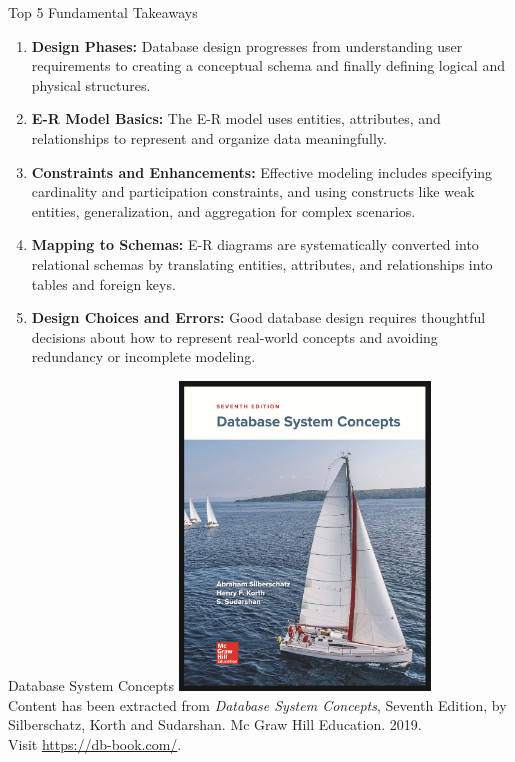 \documentclass{beamer}
\begin{document}
\begin{frame}{Top 5 Fundamental Takeaways}
    \small
    \begin{enumerate} \pause
        \item[5] \textbf{Design Phases:} Database design progresses from understanding user requirements to creating a conceptual schema and finally defining logical and physical structures. \pause

        \item[4] \textbf{E-R Model Basics:} The E-R model uses entities, attributes, and relationships to represent and organize data meaningfully. \pause

        \item[3] \textbf{Constraints and Enhancements:} Effective modeling includes specifying cardinality and participation constraints, and using constructs like weak entities, generalization, and aggregation for complex scenarios. \pause

        \item[2] \textbf{Mapping to Schemas:} E-R diagrams are systematically converted into relational schemas by translating entities, attributes, and relationships into tables and foreign keys. \pause

        \item[1] \textbf{Design Choices and Errors:} Good database design requires thoughtful decisions about how to represent real-world concepts and avoiding redundancy or incomplete modeling.
    \end{enumerate}
\end{frame}

\begin{frame}{Database System Concepts}
    \centering
    \includegraphics[width=0.5\textwidth]{figures/book_cover.jpg} \\
    \vspace{5mm}
    {
        \tiny
        Content has been extracted from \textit{Database System Concepts}, Seventh Edition, by Silberschatz, Korth and Sudarshan. Mc Graw Hill Education. 2019.\\
        Visit \url{https://db-book.com/}.\\
    }
\end{frame}
\end{document}
